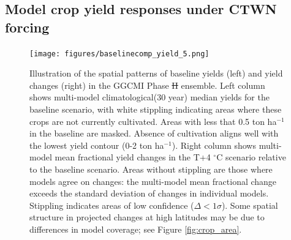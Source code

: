 \documentclass[gmd, manuscript]{copernicus} %
\providecommand{\DIFadd}[1]{{\protect\color{blue}\uwave{#1}}} %
\providecommand{\DIFdel}[1]{{\protect\color{red}\sout{#1}}}                      %
\providecommand{\DIFaddFL}[1]{\DIFadd{#1}} %
\providecommand{\DIFdelFL}[1]{\DIFdel{#1}} %
\providecommand{\DIFaddbeginFL}{} %
\providecommand{\DIFaddendFL}{} %
\providecommand{\DIFdelbeginFL}{} %
\providecommand{\DIFdelendFL}{} %
\begin{document}
\subsection{Model crop yield responses under CTWN forcing}
\begin{figure}[ht]
\centering
  \texttt{[image: figures/baselinecomp\_yield\_5.png]} 
  \caption{
  Illustration of the spatial patterns of baseline yields (left) and yield changes (right) in the GGCMI Phase \DIFdelbeginFL \DIFdelFL{II }\DIFdelendFL \DIFaddbeginFL \DIFaddFL{2 }\DIFaddendFL ensemble. 
  Left column shows multi-model climatological(30 year) median yields for the baseline scenario, with white stippling indicating areas where these crops are not currently cultivated. 
  Areas with less that 0.5 ton ha$^{-1}$ in the baseline are masked.
  Absence of cultivation aligns well with the lowest yield contour (0-2 ton ha$^{-1}$). 
  Right column shows multi-model mean fractional yield changes in the T+4 $^{\circ}$C scenario relative to the baseline scenario. 
  Areas without stippling are those where models agree on changes: the multi-model mean fractional change exceeds the standard deviation of changes in individual models. 
  Stippling indicates areas of low confidence ($\Delta < 1 \sigma$). 
  Some spatial structure in projected changes at high latitudes may be due to differences in model coverage; see Figure \ref{fig:crop_area}.
  }
  \label{fig:maizesoybaseline}
\end{figure}
\end{document}
